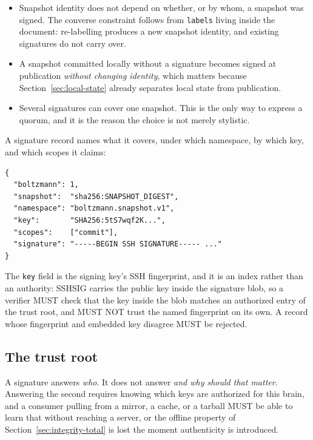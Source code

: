 \documentclass[11pt,a4paper]{article}
\begin{document}
\begin{itemize}[leftmargin=1.4em]
  \item Snapshot identity does not depend on whether, or by whom, a snapshot was
signed. The converse constraint follows from \texttt{labels} living inside the
document: re-labelling produces a new snapshot identity, and existing
signatures do not carry over.
  \item A snapshot committed locally without a signature becomes signed at
  publication \emph{without changing identity}, which matters because
  Section~\ref{sec:local-state} already separates local state from publication.
  \item Several signatures can cover one snapshot. This is the only way to
  express a quorum, and it is the reason the choice is not merely stylistic.
\end{itemize}

A signature record names what it covers, under which namespace, by which key,
and which scopes it claims:
\begin{verbatim}
{
  "boltzmann": 1,
  "snapshot":  "sha256:SNAPSHOT_DIGEST",
  "namespace": "boltzmann.snapshot.v1",
  "key":       "SHA256:5tS7wqf2K...",
  "scopes":    ["commit"],
  "signature": "-----BEGIN SSH SIGNATURE----- ..."
}
\end{verbatim}
The \texttt{key} field is the signing key's SSH fingerprint, and it is an index
rather than an authority: SSHSIG carries the public key inside the signature
blob, so a verifier MUST check that the key inside the blob matches an
authorized entry of the trust root, and MUST NOT trust the named fingerprint on
its own. A record whose fingerprint and embedded key disagree MUST be rejected.

\subsection{The trust root}
\label{sec:trust-root}

A signature answers \emph{who}. It does not answer \emph{and why should that
matter}. Answering the second requires knowing which keys are authorized for
this brain, and a consumer pulling from a mirror, a cache, or a tarball MUST be
able to learn that without reaching a server, or the offline property of
Section~\ref{sec:integrity-total} is lost the moment authenticity is introduced.
\end{document}
